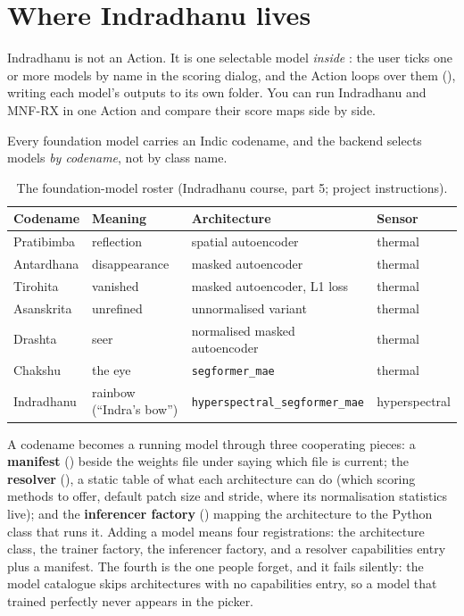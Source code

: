 \section{Where Indradhanu lives}\label{sec:product:models}

Indradhanu is not an Action. It is one selectable model \emph{inside} : the
user ticks one or more models by name in the scoring dialog, and the Action loops over them
(), writing each model's outputs to its own
 folder. You can run Indradhanu and MNF-RX in one Action and compare their
score maps side by side.

Every foundation model carries an Indic codename, and the backend selects models \emph{by
codename}, not by class name.

\begin{table}[htbp]\centering
\caption{The foundation-model roster (Indradhanu course, part 5; project instructions).}\label{tab:product:codenames}
\small
\begin{tabular}{@{}llll@{}}\toprule
Codename & Meaning & Architecture & Sensor\\\midrule
Pratibimba & reflection & spatial autoencoder & thermal\\
Antardhana & disappearance & masked autoencoder & thermal\\
Tirohita & vanished & masked autoencoder, L1 loss & thermal\\
Asanskrita & unrefined & unnormalised variant & thermal\\
Drashta & seer & normalised masked autoencoder & thermal\\
Chakshu & the eye & \texttt{segformer\_mae} & thermal\\
Indradhanu & rainbow (``Indra's bow'') & \texttt{hyperspectral\_segformer\_mae} & hyperspectral\\\bottomrule
\end{tabular}
\end{table}

A codename becomes a running model through three cooperating pieces: a \textbf{manifest}
() beside the weights file under 
saying which file is current; the \textbf{resolver}
(), a static table of what each architecture
can do (which scoring methods to offer, default patch size and stride, where its normalisation
statistics live); and the \textbf{inferencer factory}
() mapping the architecture to the
Python class that runs it. Adding a model means four registrations: the architecture class, the
trainer factory, the inferencer factory, and a resolver capabilities entry plus a manifest. The
fourth is the one people forget, and it fails silently: the model catalogue skips architectures
with no capabilities entry, so a model that trained perfectly never appears in the picker.

